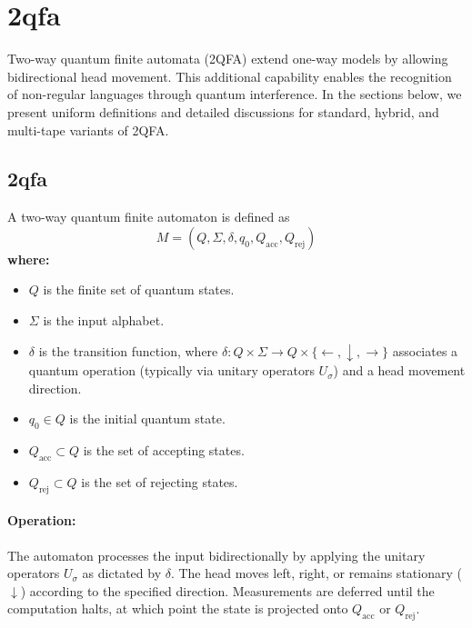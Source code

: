 \section{\acrfull{2qfa}}
\label{sec:two-way-qfas}

Two-way quantum finite automata (2QFA) extend one-way models by allowing bidirectional head movement. This additional capability enables the recognition of non-regular languages through quantum interference. In the sections below, we present uniform definitions and detailed discussions for standard, hybrid, and multi-tape variants of 2QFA.


\subsection{\acrfull{2qfa}}
\label{subsec:2qfa}
\begin{definition}
A two-way quantum finite automaton is defined as 
\[
M = (Q, \Sigma, \delta, q_0, Q_{\text{acc}}, Q_{\text{rej}})
\]
\textbf{where:}
\begin{itemize}
    \item \( Q \) is the finite set of quantum states.
    \item \( \Sigma \) is the input alphabet.
    \item \( \delta \) is the transition function, where \(\delta: Q \times \Sigma \to Q \times \{\leftarrow, \downarrow, \rightarrow\}\) associates a quantum operation (typically via unitary operators \( U_\sigma \)) and a head movement direction.
    \item \( q_0 \in Q \) is the initial quantum state.
    \item \( Q_{\text{acc}} \subset Q \) is the set of accepting states.
    \item \( Q_{\text{rej}} \subset Q \) is the set of rejecting states.
\end{itemize}
\end{definition}

\paragraph{Operation:}  
The automaton processes the input bidirectionally by applying the unitary operators \( U_\sigma \) as dictated by \( \delta \). The head moves left, right, or remains stationary (\(\downarrow\)) according to the specified direction. Measurements are deferred until the computation halts, at which point the state is projected onto \( Q_{\text{acc}} \) or \( Q_{\text{rej}} \).

